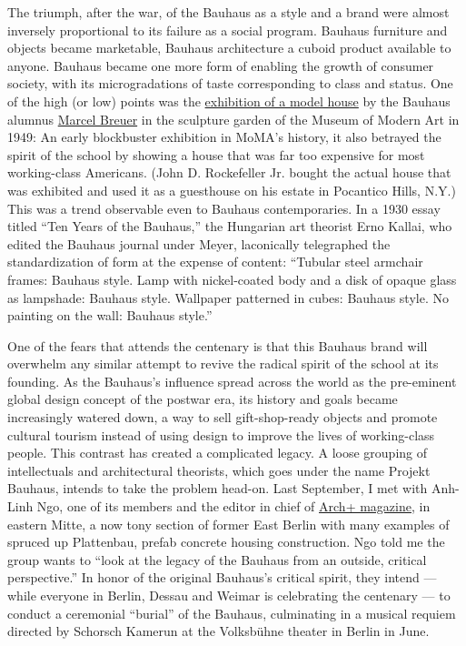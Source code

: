 The triumph, after the war, of the Bauhaus as a style and a brand were
almost inversely proportional to its failure as a social program.
Bauhaus furniture and objects became marketable, Bauhaus architecture a
cuboid product available to anyone. Bauhaus became one more form of
enabling the growth of consumer society, with its microgradations of
taste corresponding to class and status. One of the high (or low) points
was the
\href{https://www.moma.org/calendar/exhibitions/3251?}{exhibition of a
model house} by the Bauhaus alumnus
\href{https://www.nytimes3xbfgragh.onion/1981/07/02/nyregion/marcel-breuer-79-dies-architect-and-designer.html}{Marcel
Breuer} in the sculpture garden of the Museum of Modern Art in 1949: An
early blockbuster exhibition in MoMA's history, it also betrayed the
spirit of the school by showing a house that was far too expensive for
most working-class Americans. (John D. Rockefeller Jr. bought the actual
house that was exhibited and used it as a guesthouse on his estate in
Pocantico Hills, N.Y.) This was a trend observable even to Bauhaus
contemporaries. In a 1930 essay titled ``Ten Years of the Bauhaus,'' the
Hungarian art theorist Erno Kallai, who edited the Bauhaus journal under
Meyer, laconically telegraphed the standardization of form at the
expense of content: ``Tubular steel armchair frames: Bauhaus style. Lamp
with nickel-coated body and a disk of opaque glass as lampshade: Bauhaus
style. Wallpaper patterned in cubes: Bauhaus style. No painting on the
wall: Bauhaus style.''

One of the fears that attends the centenary is that this Bauhaus brand
will overwhelm any similar attempt to revive the radical spirit of the
school at its founding. As the Bauhaus's influence spread across the
world as the pre-eminent global design concept of the postwar era, its
history and goals became increasingly watered down, a way to sell
gift-shop-ready objects and promote cultural tourism instead of using
design to improve the lives of working-class people. This contrast has
created a complicated legacy. A loose grouping of intellectuals and
architectural theorists, which goes under the name Projekt Bauhaus,
intends to take the problem head-on. Last September, I met with Anh-Linh
Ngo, one of its members and the editor in chief of
\href{https://www.archplus.net/home/}{Arch+ magazine}, in eastern Mitte,
a now tony section of former East Berlin with many examples of spruced
up Plattenbau, prefab concrete housing construction. Ngo told me the
group wants to ``look at the legacy of the Bauhaus from an outside,
critical perspective.'' In honor of the original Bauhaus's critical
spirit, they intend --- while everyone in Berlin, Dessau and Weimar is
celebrating the centenary --- to conduct a ceremonial ``burial'' of the
Bauhaus, culminating in a musical requiem directed by Schorsch Kamerun
at the Volksbühne theater in Berlin in June.


